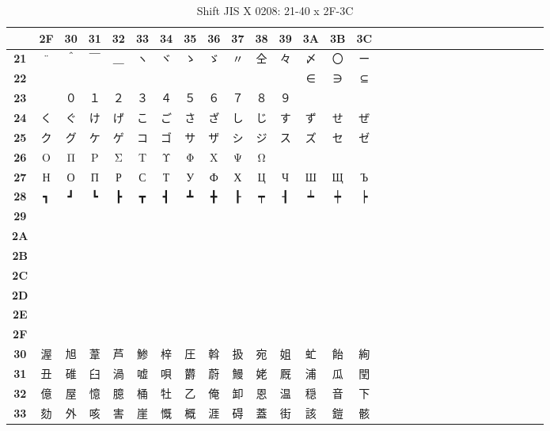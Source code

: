 \begin{table}[H]
\centering
\caption{Shift JIS X 0208: 21-40 x 2F-3C}
\begin{tabular}{|Sc|Sc|Sc|Sc|Sc|Sc|Sc|Sc|Sc|Sc|Sc|Sc|Sc|Sc|Sc|}
\hline
 & \textbf{2F} & \textbf{30} & \textbf{31} & \textbf{32} & \textbf{33} & \textbf{34} & \textbf{35} & \textbf{36} & \textbf{37} & \textbf{38} & \textbf{39} & \textbf{3A} & \textbf{3B} & \textbf{3C} \\ \hline
\textbf{21} & ¨ & ＾ & ￣ & ＿ & ヽ & ヾ & ゝ & ゞ & 〃 & 仝 & 々 & 〆 & 〇 & ー \\ \hline
\textbf{22} &   &   &   &   &   &   &   &   &   &   &   & ∈ & ∋ & ⊆ \\ \hline
\textbf{23} &   & ０ & １ & ２ & ３ & ４ & ５ & ６ & ７ & ８ & ９ &   &   &   \\ \hline
\textbf{24} & く & ぐ & け & げ & こ & ご & さ & ざ & し & じ & す & ず & せ & ぜ \\ \hline
\textbf{25} & ク & グ & ケ & ゲ & コ & ゴ & サ & ザ & シ & ジ & ス & ズ & セ & ゼ \\ \hline
\textbf{26} & Ο & Π & Ρ & Σ & Τ & Υ & Φ & Χ & Ψ & Ω &   &   &   &   \\ \hline
\textbf{27} & Н & О & П & Р & С & Т & У & Ф & Х & Ц & Ч & Ш & Щ & Ъ \\ \hline
\textbf{28} & ┓ & ┛ & ┗ & ┣ & ┳ & ┫ & ┻ & ╋ & ┠ & ┯ & ┨ & ┷ & ┿ & ┝ \\ \hline
\textbf{29} &  &  &  &  &  &  &  &  &  &  &  &  &  &  \\ \hline
\textbf{2A} &  &  &  &  &  &  &  &  &  &  &  &  &  &  \\ \hline
\textbf{2B} &  &  &  &  &  &  &  &  &  &  &  &  &  &  \\ \hline
\textbf{2C} &  &  &  &  &  &  &  &  &  &  &  &  &  &  \\ \hline
\textbf{2D} &  &  &  &  &  &  &  &  &  &  &  &  &  &  \\ \hline
\textbf{2E} &  &  &  &  &  &  &  &  &  &  &  &  &  &  \\ \hline
\textbf{2F} &  &  &  &  &  &  &  &  &  &  &  &  &  &  \\ \hline
\textbf{30} & 渥 & 旭 & 葦 & 芦 & 鯵 & 梓 & 圧 & 斡 & 扱 & 宛 & 姐 & 虻 & 飴 & 絢 \\ \hline
\textbf{31} & 丑 & 碓 & 臼 & 渦 & 嘘 & 唄 & 欝 & 蔚 & 鰻 & 姥 & 厩 & 浦 & 瓜 & 閏 \\ \hline
\textbf{32} & 億 & 屋 & 憶 & 臆 & 桶 & 牡 & 乙 & 俺 & 卸 & 恩 & 温 & 穏 & 音 & 下 \\ \hline
\textbf{33} & 劾 & 外 & 咳 & 害 & 崖 & 慨 & 概 & 涯 & 碍 & 蓋 & 街 & 該 & 鎧 & 骸 \\ \hline

\end{tabular}
\end{table}
